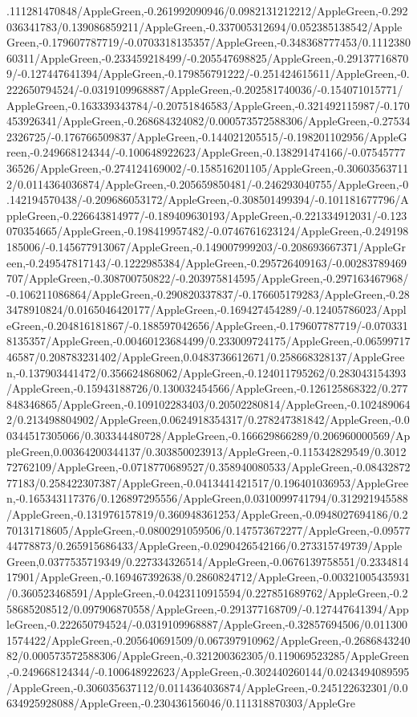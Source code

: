 {\begin{tikzternal}
{.111281470848/AppleGreen,-0.261992090946/0.0982131212212/AppleGreen,-0.292036341783/0.139086859211/AppleGreen,-0.337005312694/0.052385138542/AppleGreen,-0.179607787719/-0.0703318135357/AppleGreen,-0.348368777453/0.111238060311/AppleGreen,-0.233459218499/-0.205547698825/AppleGreen,-0.291377168709/-0.127447641394/AppleGreen,-0.179856791222/-0.251424615611/AppleGreen,-0.222650794524/-0.0319109968887/AppleGreen,-0.202581740036/-0.154071015771/AppleGreen,-0.163339343784/-0.20751846583/AppleGreen,-0.321492115987/-0.170453926341/AppleGreen,-0.268684324082/0.000573572588306/AppleGreen,-0.275342326725/-0.176766509837/AppleGreen,-0.144021205515/-0.198201102956/AppleGreen,-0.249668124344/-0.100648922623/AppleGreen,-0.138291474166/-0.0754577736526/AppleGreen,-0.274124169002/-0.158516201105/AppleGreen,-0.306035637112/0.0114364036874/AppleGreen,-0.205659850481/-0.246293040755/AppleGreen,-0.142194570438/-0.209686053172/AppleGreen,-0.308501499394/-0.101181677796/AppleGreen,-0.226643814977/-0.189409630193/AppleGreen,-0.221334912031/-0.123070354665/AppleGreen,-0.198419957482/-0.0746761623124/AppleGreen,-0.249198185006/-0.145677913067/AppleGreen,-0.149007999203/-0.208693667371/AppleGreen,-0.249547817143/-0.1222985384/AppleGreen,-0.295726409163/-0.00283789469707/AppleGreen,-0.308700750822/-0.203975814595/AppleGreen,-0.297163467968/-0.106211086864/AppleGreen,-0.290820337837/-0.176605179283/AppleGreen,-0.283478910824/0.0165046420177/AppleGreen,-0.169427454289/-0.12405786023/AppleGreen,-0.204816181867/-0.188597042656/AppleGreen,-0.179607787719/-0.0703318135357/AppleGreen,-0.00460123684499/0.233009724175/AppleGreen,-0.0659971746587/0.208783231402/AppleGreen,0.0483736612671/0.258668328137/AppleGreen,-0.137903441472/0.356624868062/AppleGreen,-0.124011795262/0.283043154393/AppleGreen,-0.15943188726/0.130032454566/AppleGreen,-0.126125868322/0.277848346865/AppleGreen,-0.109102283403/0.20502280814/AppleGreen,-0.1024890642/0.213498804902/AppleGreen,0.0624918354317/0.278247381842/AppleGreen,-0.00344517305066/0.303344480728/AppleGreen,-0.166629866289/0.206960000569/AppleGreen,0.00364200344137/0.303850023913/AppleGreen,-0.115342829549/0.301272762109/AppleGreen,-0.0718770689527/0.358940080533/AppleGreen,-0.0843287277183/0.258422307387/AppleGreen,-0.0413441421517/0.196401036953/AppleGreen,-0.165343117376/0.126897295556/AppleGreen,0.0310099741794/0.312921945588/AppleGreen,-0.131976157819/0.360948361253/AppleGreen,-0.0948027694186/0.270131718605/AppleGreen,-0.0800291059506/0.147573672277/AppleGreen,-0.0957744778873/0.265915686433/AppleGreen,-0.0290426542166/0.273315749739/AppleGreen,0.0377535719349/0.227334326514/AppleGreen,-0.0676139758551/0.233481417901/AppleGreen,-0.169467392638/0.2860824712/AppleGreen,-0.00321005435931/0.360523468591/AppleGreen,-0.0423110915594/0.227851689762/AppleGreen,-0.258685208512/0.097906870558/AppleGreen,-0.291377168709/-0.127447641394/AppleGreen,-0.222650794524/-0.0319109968887/AppleGreen,-0.32857694506/0.0113001574422/AppleGreen,-0.205640691509/0.067397910962/AppleGreen,-0.268684324082/0.000573572588306/AppleGreen,-0.321200362305/0.119069523285/AppleGreen,-0.249668124344/-0.100648922623/AppleGreen,-0.302440260144/0.0243494089595/AppleGreen,-0.306035637112/0.0114364036874/AppleGreen,-0.245122632301/0.0634925928088/AppleGreen,-0.230436156046/0.111318870303/AppleGre}
\end{tikzternal}}
